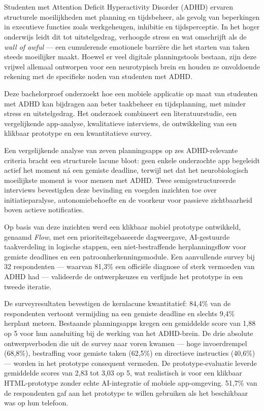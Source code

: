 \chapter*{}

Studenten met Attention Deficit Hyperactivity Disorder (ADHD) ervaren structurele
moeilijkheden met planning en tijdsbeheer, als gevolg van beperkingen in
executieve functies zoals werkgeheugen, inhibitie en tijdsperceptie. In het hoger
onderwijs leidt dit tot uitstelgedrag, verhoogde stress en wat
\textcite{Barkley2022} omschrijft als de \textit{wall of awful} — een
cumulerende emotionele barrière die het starten van taken steeds moeilijker
maakt. Hoewel er veel digitale planningstools bestaan, zijn deze vrijwel allemaal
ontworpen voor een neurotypisch brein en houden ze onvoldoende rekening met de
specifieke noden van studenten met ADHD.

Deze bachelorproef onderzoekt hoe een mobiele applicatie op maat van studenten
met ADHD kan bijdragen aan beter taakbeheer en tijdsplanning, met minder stress
en uitstelgedrag. Het onderzoek combineert een literatuurstudie, een vergelijkende
app-analyse, kwalitatieve interviews, de ontwikkeling van een klikbaar prototype
en een kwantitatieve survey.

Een vergelijkende analyse van zeven planningsapps op zes ADHD-relevante criteria
bracht een structurele lacune bloot: geen enkele onderzochte app begeleidt
actief het moment ná een gemiste deadline, terwijl net dat het neurobiologisch
moeilijkste moment is voor mensen met ADHD. Twee semigestructureerde interviews
bevestigden deze bevinding en voegden inzichten toe over initiatieparalyse,
autonomiebehoefte en de voorkeur voor passieve zichtbaarheid boven actieve
notificaties.

Op basis van deze inzichten werd een klikbaar mobiel prototype ontwikkeld,
genaamd \textit{Flow}, met een prioriteitsgebaseerde dagweergave, AI-gestuurde
taakverdeling in logische stappen, een niet-bestraffende herplanningsflow voor
gemiste deadlines en een patroonherkenningsmodule. Een aanvullende survey bij
32 respondenten — waarvan 81,3\% een officiële diagnose of sterk vermoeden van
ADHD had — valideerde de ontwerpkeuzes en verfijnde het prototype in een tweede
iteratie.

De surveyresultaten bevestigen de kernlacune kwantitatief: 84,4\% van de
respondenten vertoont vermijding na een gemiste deadline en slechts 9,4\%
herplant meteen. Bestaande planningsapps kregen een gemiddelde score van 1,88
op 5 voor hun aansluiting bij de werking van het ADHD-brein. De drie absolute
ontwerpverboden die uit de survey naar voren kwamen — hoge invoerdrempel
(68,8\%), bestraffing voor gemiste taken (62,5\%) en directieve instructies
(40,6\%) — worden in het prototype consequent vermeden. De prototype-evaluatie
leverde gemiddelde scores van 2,83 tot 3,03 op 5, wat realistisch is voor een
klikbaar HTML-prototype zonder echte AI-integratie of mobiele app-omgeving.
51,7\% van de respondenten gaf aan het prototype te willen gebruiken als het
beschikbaar was op hun telefoon.

